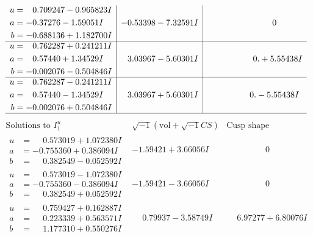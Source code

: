 \documentclass[1p]{elsarticle_modified}
\theoremstyle{definition}
\newcommand{\I}{\sqrt{-1}}
\begin{document}
$$\begin{array}{c|c|c}
\begin{aligned}
u &= \phantom{-}0.709247 - 0.965823 I \\
a &= -0.37276 - 1.59051 I \\
b &= -0.688136 + 1.182700 I\end{aligned}
 & -0.53398 - 7.32591 I & \phantom{-0.000000 } 0 \\ \hline\begin{aligned}
u &= \phantom{-}0.762287 + 0.241211 I \\
a &= \phantom{-}0.57440 + 1.34529 I \\
b &= -0.002076 - 0.504846 I\end{aligned}
 & \phantom{-}3.03967 - 5.60301 I & \phantom{-0.000000 -}0. + 5.55438 I \\ \hline\begin{aligned}
u &= \phantom{-}0.762287 - 0.241211 I \\
a &= \phantom{-}0.57440 - 1.34529 I \\
b &= -0.002076 + 0.504846 I\end{aligned}
 & \phantom{-}3.03967 + 5.60301 I & \phantom{-0.000000 } 0. - 5.55438 I\\
 \hline 
 \end{array}$$\newpage$$\begin{array}{c|c|c}  
\text{Solutions to }I^u_{1}& \I (\text{vol} + \sqrt{-1}CS) & \text{Cusp shape}\\
 \hline 
\begin{aligned}
u &= \phantom{-}0.573019 + 1.072380 I \\
a &= -0.755360 + 0.386094 I \\
b &= \phantom{-}0.382549 - 0.052592 I\end{aligned}
 & -1.59421 + 3.66056 I & \phantom{-0.000000 } 0 \\ \hline\begin{aligned}
u &= \phantom{-}0.573019 - 1.072380 I \\
a &= -0.755360 - 0.386094 I \\
b &= \phantom{-}0.382549 + 0.052592 I\end{aligned}
 & -1.59421 - 3.66056 I & \phantom{-0.000000 } 0 \\ \hline\begin{aligned}
u &= \phantom{-}0.759427 + 0.162887 I \\
a &= \phantom{-}0.223339 + 0.563571 I \\
b &= \phantom{-}1.177310 + 0.550276 I\end{aligned}
 & \phantom{-}0.79937 - 3.58749 I & \phantom{-}6.97277 + 6.80076 I \\ \hline\begin{aligned}

\end{aligned}
\end{array}$$
\end{document}
